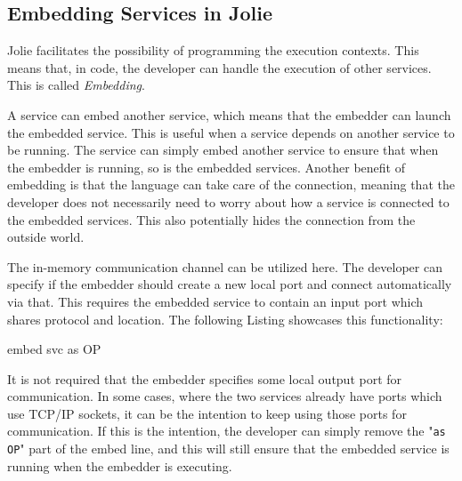 \subsection{Embedding Services in Jolie}
Jolie facilitates the possibility of programming the execution contexts.
This means that, in code, the developer can handle the execution of other services. This is called \emph{Embedding}.

A service can embed another service, which means that the embedder can launch the embedded service. This is useful when a service depends on another service to be running.
The service can simply embed another service to ensure that when the embedder is running, so is the embedded services.
Another benefit of embedding is that the language can take care of the connection, meaning that the developer does not necessarily need to worry about how a service is connected to the embedded services.
This also potentially hides the connection from the outside world.

The in-memory communication channel can be utilized here. The developer can specify if the embedder should create a new local port and connect automatically via that. This requires the embedded service to contain an input port which shares protocol and location.
The following Listing showcases this functionality:

\begin{jolisting}[][caption={
    }, label=lst:embed-as]
embed svc as OP
\end{jolisting}

It is not required that the embedder specifies some local output port for communication. In some cases, where the two services already have ports which use TCP/IP sockets,
it can be the intention to keep using those ports for communication. If this
is the intention, the developer can simply remove the "\texttt{as OP}" part of the embed line, and this will still ensure that the embedded service is running when the embedder is executing.

